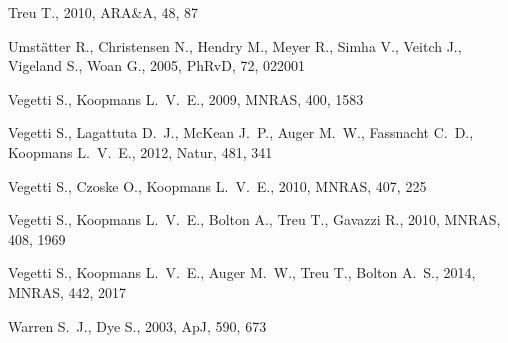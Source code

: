 \documentclass[useAMS,usenatbib]{mn2e}
\begin{document}
\begin{thebibliography}{99}
 Treu T., 2010, ARA\&A, 48, 87 

 Umst{\"a}tter R., Christensen N., Hendry 
M., Meyer R., Simha V., Veitch J., Vigeland S., Woan G., 2005, PhRvD, 72, 
022001 

 Vegetti S., Koopmans L.~V.~E., 2009, MNRAS, 400, 1583

 Vegetti S., Lagattuta D.~J., McKean J.~P., 
Auger M.~W., Fassnacht C.~D., Koopmans L.~V.~E., 2012, Natur, 481, 341 

 Vegetti S., Czoske O., Koopmans L.~V.~E., 2010, MNRAS, 407, 225

 Vegetti S., Koopmans L.~V.~E., Bolton A., 
Treu T., Gavazzi R., 2010, MNRAS, 408, 1969 

 Vegetti S., Koopmans L.~V.~E., Auger 
M.~W., Treu T., Bolton A.~S., 2014, MNRAS, 442, 2017 

 Warren S.~J., Dye S., 2003, ApJ, 590, 673
\end{thebibliography}
\end{document}
